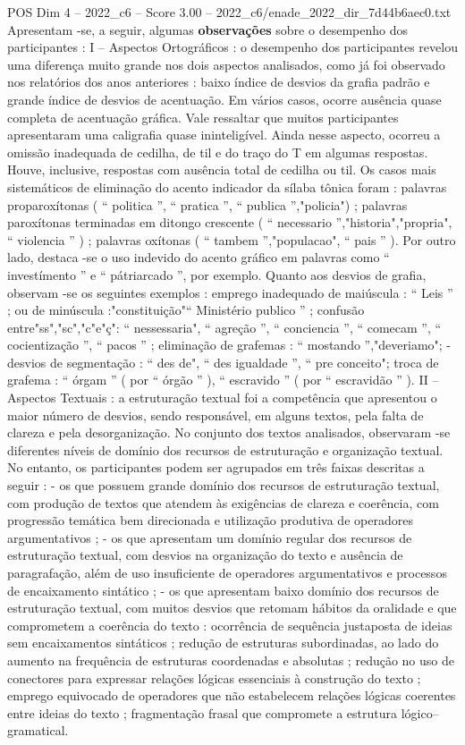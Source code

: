 \begin{textsample}{POS Dim 4 – 2022\_c6 – Score 3.00 – 2022\_c6/enade\_2022\_dir\_7d44b6aec0.txt}
Apresentam -se, a seguir, algumas \textbf{observações} sobre o desempenho dos participantes : I – Aspectos Ortográficos : o desempenho dos participantes revelou uma diferença muito grande nos dois aspectos analisados, como já foi observado nos relatórios dos anos anteriores : baixo índice de desvios da grafia padrão e grande índice de desvios de acentuação.
Em vários casos, ocorre ausência quase completa de acentuação gráfica.
Vale ressaltar que muitos participantes apresentaram uma caligrafia quase ininteligível.
Ainda nesse aspecto, ocorreu a omissão inadequada de cedilha, de til e do traço do T em algumas respostas.
Houve, inclusive, respostas com ausência total de cedilha ou til.
Os casos mais sistemáticos de eliminação do acento indicador da sílaba tônica foram : palavras proparoxítonas ( “ politica ”, “ pratica ”, “ publica ”,"policia") ; palavras paroxítonas terminadas em ditongo crescente ( “ necessario ”,"historia","propria", “ violencia ” ) ; palavras oxítonas ( “ tambem ”,"populacao", “ pais ” ).
Por outro lado, destaca -se o uso indevido do acento gráfico em palavras como “ investímento ” e “ pátriarcado ”, por exemplo.
Quanto aos desvios de grafia, observam -se os seguintes exemplos : emprego inadequado de maiúscula : “ Leis ” ; ou de minúscula :"constituição"“ Ministério publico ” ; confusão entre"ss","sc","c"e"ç": “ nessessaria", “ agreção ”, “ conciencia ”, “ comecam ”, “ cocientização ”, “ pacos ” ; eliminação de grafemas : “ mostando ”,"deveriamo"; - desvios de segmentação : “ des de", “ des igualdade ”, “ pre conceito"; troca de grafema : “ órgam ” ( por “ órgão ” ), “ escravido ” ( por “ escravidão ” ).
II – Aspectos Textuais : a estruturação textual foi a competência que apresentou o maior número de desvios, sendo responsável, em alguns textos, pela falta de clareza e pela desorganização.
No conjunto dos textos analisados, observaram -se diferentes níveis de domínio dos recursos de estruturação e organização textual.
No entanto, os participantes podem ser agrupados em três faixas descritas a seguir : - os que possuem grande domínio dos recursos de estruturação textual, com produção de textos que atendem às exigências de clareza e coerência, com progressão temática bem direcionada e utilização produtiva de operadores argumentativos ; - os que apresentam um domínio regular dos recursos de estruturação textual, com desvios na organização do texto e ausência de paragrafação, além de uso insuficiente de operadores argumentativos e processos de encaixamento sintático ; - os que apresentam baixo domínio dos recursos de estruturação textual, com muitos desvios que retomam hábitos da oralidade e que comprometem a coerência do texto : ocorrência de sequência justaposta de ideias sem encaixamentos sintáticos ; redução de estruturas subordinadas, ao lado do aumento na frequência de estruturas coordenadas e absolutas ; redução no uso de conectores para expressar relações lógicas essenciais à construção do texto ; emprego equivocado de operadores que não estabelecem relações lógicas coerentes entre ideias do texto ; fragmentação frasal que compromete a estrutura lógico–gramatical.

\end{textsample}
